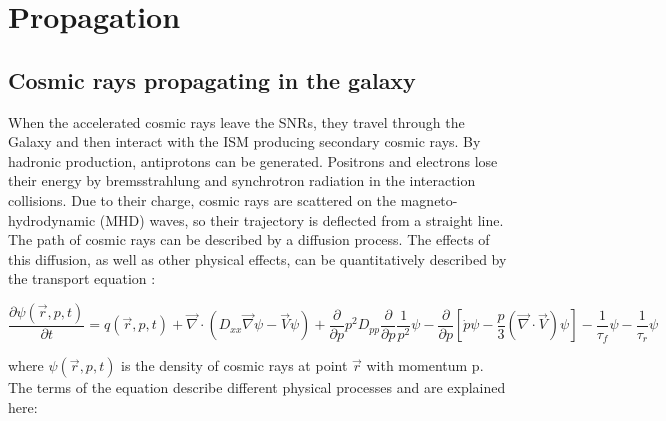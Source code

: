 
\section{Propagation}

\subsection{Cosmic rays propagating in the galaxy}
When the accelerated cosmic rays leave the SNRs, they travel through the Galaxy and then interact with the ISM producing secondary cosmic rays. By hadronic production, antiprotons can be generated. Positrons and electrons lose their energy by bremsstrahlung and synchrotron radiation in the interaction collisions. Due to their charge, cosmic rays are scattered on the magneto-hydrodynamic (MHD) waves, so their trajectory is deflected from a straight line. The path of cosmic rays can be described by a diffusion process. The effects of this diffusion, as well as other physical effects, can be quantitatively described by the transport equation \cite{CosmicRayPropagationEquation}:     

\begin{equation}  
\frac{ \partial \psi(\vec{r},p,t)}{\partial t} = q(\vec{r},p,t)  + \vec{\nabla} \cdot  (D_{xx} \vec{\nabla} \psi - \vec{V}\psi) + \frac{\partial}{\partial p}p^2 D_{pp} \frac{\partial}{\partial p} \frac{1}{p^2}\psi - \frac{\partial}{\partial p } \left [ \dot p \psi - \frac{p}{3}(\vec{\nabla} \cdot \vec{V}) \psi \right ] - \frac{1}{\tau_{f}}\psi - \frac{1}{\tau_{r}}\psi
\label{PropagationEquation}
\end{equation}

where $\psi(\vec{r},p,t)$ is the density of cosmic rays at point $\vec{r}$ with momentum p. The terms of the equation describe different physical processes and are explained here:

